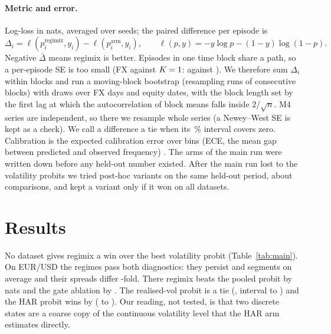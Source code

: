 \documentclass{article}
\begin{document}
\paragraph{Metric and error.}
Log-loss in nats, averaged over \nFxSeeds{} seeds; the paired difference per episode is
\begin{equation}
  \Delta_i = \ell(p_i^{\text{regimix}},y_i)-\ell(p_i^{\text{arm}},y_i),\qquad \ell(p,y)=-y\log p-(1-y)\log(1-p).
  \label{eq:delta}
\end{equation}
Negative $\bar\Delta$ means regimix is better.
Episodes in one time block share a path, so a per-episode SE is too small (FX against $K=1$: \nFxKoneNaiveSE{} against \nFxKoneSE).
We therefore sum $\Delta_i$ within blocks and run a moving-block bootstrap \citep{kunsch1989} (resampling runs of consecutive blocks) with \nCfgBoot{} draws over \nFxNUnits{} FX days and \nEqNUnits{} equity dates, with the block length set by the first lag at which the autocorrelation of block means falls inside $2/\sqrt n$.
M4 series are independent, so there we resample \nMfNUnits{} whole series (a Newey--West SE \citep{neweywest1987} is kept as a check).
We call a difference a tie when its \nCfgCI\,\% interval covers zero.
Calibration is the expected calibration error over \nCfgBins{} bins (ECE, the mean gap between predicted and observed frequency) \citep{guo2017}.
The \nCfgNArms{} arms of the main run were written down before any held-out number existed.
After the main run lost to the volatility probits we tried \nCfgNVariants{} post-hoc variants on the same held-out period, about \nCfgNPostCmp{} comparisons, and kept a variant only if it won on all \nCfgNData{} datasets.

\section{Results}
\label{sec:results}

No dataset gives regimix a win over the best volatility probit (Table~\ref{tab:main}).
On EUR/USD the regimes pass both diagnostics: they persist \nFxDwellA{} and \nFxDwellB{} segments on average and their spreads differ \nFxSpreadRatio-fold. There regimix beats the pooled probit by \nFxKoneAbsD{} nats and the gate ablation by \nFxGateAbsD.
The realised-vol probit is a tie (\nFxRvD, interval \nFxRvLo{} to \nFxRvHi) and the HAR probit wins by \nFxHarAbsD{} (\nFxHarLo{} to \nFxHarHi). Our reading, not tested, is that two discrete states are a coarse copy of the continuous volatility level that the HAR arm estimates directly.
\end{document}
